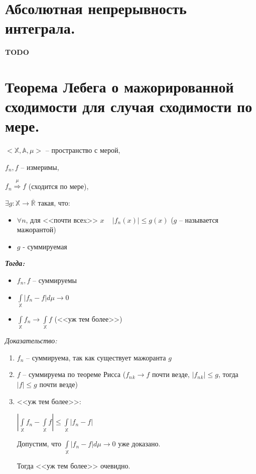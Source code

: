 \documentclass[paper=a4, fontsize=13.2pt]{article}
\begin{document}
\section{Абсолютная непрерывность интеграла.}
\textbf{TODO}
\section{Теорема Лебега о мажорированной сходимости для случая сходимости по мере.}

\begin{flushleft}

$<\mathds{X}, \mathds{A}, \mu>$ -- пространство с мерой,

$f_n, f$ -- измеримы,

$f_n\stackrel{\mu}{\Rightarrow}f$ (сходится по мере),

$\exists g : \mathds{X} \rightarrow \overline{\mathds{R}}$ такая, что:
\begin{itemize}
\item
$\forall n$,  для <<почти всеx>> $x$ ~ $|f_n(x)| \leq g(x)$ ($g$ -- называется мажорантой)
\item	
$g$ - суммируемая
\end{itemize}

\emph{\textbf{Тогда:}}
\begin{itemize}
    \item $f_n, f$ -- суммируемы
    \item $\int\limits_{\mathds{X}} |f_n - f| d\mu \rightarrow 0$
    \item $\int\limits_{\mathds{X}} f_n \rightarrow \int\limits_{\mathds{X}} f$ (<<уж тем более>>)
\end{itemize}

\emph{Доказательство:}

\begin{enumerate}
	\item $f_n$ -- суммируема, так как существует мажоранта $g$
	\item $f$ -- суммируема по теореме Рисса ($ f_n{_k} \rightarrow f $ почти везде, $ |f_n{_k}| \leq g$, тогда $|f| \leq g$ почти везде)
	\item <<уж тем более>>: 
	
	$ |\int\limits_{\mathbb{X}} f_n - \int\limits_{\mathbb{X}} f| \leq \int\limits_{\mathbb{X}} |f_n - f| $
	
	Допустим, что $\int\limits_{\mathds{X}} |f_n - f| d\mu \rightarrow 0$ уже доказано.
	
	Тогда <<уж тем более>> очевидно.
	

\end{enumerate}
\end{flushleft}
\end{document}
